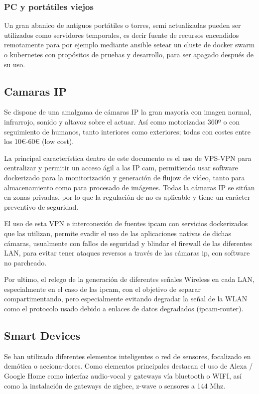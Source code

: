 \subsubsection{PC y portátiles viejos}
Un gran abanico de antiguos portátiles o torres, semi actualizadas pueden ser utilizados como servidores temporales, es decir fuente de recursos encendidos remotamente para por ejemplo mediante ansible setear un cluste de docker swarm o kubernetes con propósitos de pruebas y desarrollo, para ser apagado después de su uso.

\subsection{Camaras IP}
Se dispone de una amalgama de cámaras IP la gran mayoría con imagen normal, infrarrojo, sonido y altavoz sobre el actuar. Así como motorizadas 360º o con seguimiento de humanos, tanto interiores como exteriores; todas con costes entre los 10€-60€ (low cost).

La principal característica dentro de este documento es el uso de VPS-VPN para centralizar y permitir un acceso ágil a las IP cam, permitiendo usar software dockerizado para la monitorización y generación de flujow de vídeo, tanto para almacenamiento como para procesado de imágenes. Todas la cámaras IP se sitúan en zonas privadas, por lo que la regulación de no es aplicable y tiene un carácter preventivo de seguridad.

El uso de esta VPN e interconexión de fuentes ipcam con servicios dockerizados que las utilizan, permite evadir el uso de las aplicaciones nativas de dichas cámaras, usualmente con fallos de seguridad y blindar el firewall de las diferentes LAN, para evitar tener ataques reversos a través de las cámaras ip, con software no parcheado.

Por ultimo, el relego de la generación de diferentes señales Wireless en cada LAN, especialmente en el caso de las ipcam, con el objetivo de separar compartimentando, pero especialmente evitando degradar la señal de la WLAN como el protocolo usado debido a enlaces de datos degradados (ipcam-router). 

\subsection{Smart Devices}

Se han utilizado diferentes elementos inteligentes o red de sensores, focalizado en demótica o acciona-dores. Como elementos principales destacan el uso de Alexa / Google Home como interfaz audio-vocal y gateways vía bluetooth o WIFI, así como la instalación de gateways de zigbee, z-wave o sensores a 144 Mhz.

